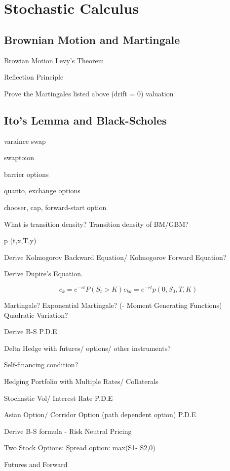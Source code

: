 \documentclass[11pt, openany]{book}              %
\begin{document}
\part{Stochastic Calculus}

\chapter{Brownian Motion and Martingale}

Browian Motion
Levy’s Theorem

Reflection Principle

Prove the Martingales listed above (drift = 0)
valuation

\chapter{Ito's Lemma and Black-Scholes}


varaince swap

swaptoion

barrier options

quanto, exchange options

chooser, cap, forward-start option

What is transition density? Transition density of BM/GBM?

p (t,x,T,y)

Derive Kolmogorov Backward Equation/ Kolmogorov Forward Equation?

Derive Dupire’s Equation.

$$c_k = e^{-rt} P(S_t >K) c_{kk} = e^{-rt} p(0,S_0,T,K)$$

Martingale? Exponential Martingale? (- Moment Generating Functions) Quadratic Variation?

Derive B-S P.D.E

Delta Hedge with futures/ options/ other instruments?

Self-financing condition?

Hedging Portfolio with Multiple Rates/ Collaterals

Stochastic Vol/ Interest Rate P.D.E

Asian Option/ Corridor Option (path dependent option) P.D.E

Derive B-S formula - Risk Neutral Pricing

%
Two Stock Options: Spread option: max(S1- S2,0)

Futures and Forward
\end{document}

